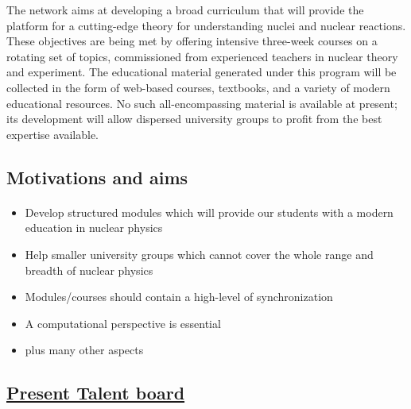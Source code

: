 \documentclass[%
oneside,                 %
final,                   %
10pt]{article}
\begin{document}
The network aims at developing a broad curriculum that will provide the platform for a cutting-edge theory for understanding nuclei and nuclear reactions. These objectives are being met by offering intensive three-week courses on a rotating set of topics, commissioned from experienced teachers in nuclear theory and experiment. The educational material generated under this program will be collected in the form of web-based courses, textbooks, and a variety of modern educational resources. No such all-encompassing material is available at present; its development will allow dispersed university groups to profit from the best expertise available.



\subsection{Motivations and aims}

\paragraph{}
\begin{itemize}
\item Develop structured modules which will provide our students with a modern education in nuclear physics

\item Help smaller university groups which cannot cover the whole range and breadth of nuclear physics

\item Modules/courses should contain a high-level of synchronization

\item A computational perspective is essential

\item plus many other aspects
\end{itemize}

\noindent




\subsection{\href{{http://fribtheoryalliance.org/TALENT/content/board.php}}{Present Talent board}}

\end{document}
